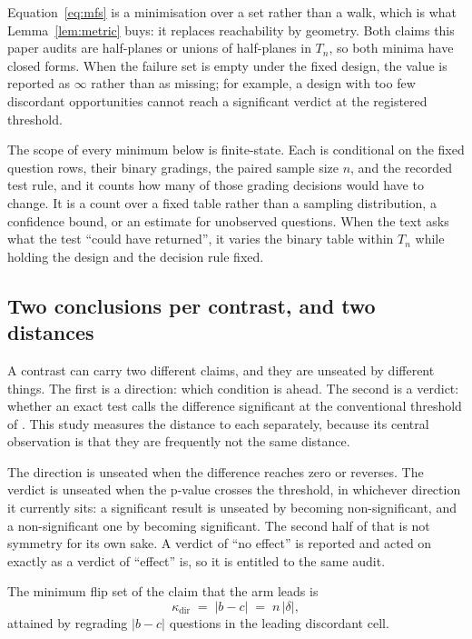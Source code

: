 Equation~\eqref{eq:mfs} is a minimisation over a set rather than a walk, which
is what Lemma~\ref{lem:metric} buys: it replaces reachability by geometry. Both
claims this paper audits are half-planes or unions of half-planes in $T_n$, so
both minima have closed forms.
When the failure set is empty under the fixed design, the value is reported as
$\infty$ rather than as missing; for example, a design with too few discordant
opportunities cannot reach a significant verdict at the registered threshold.

The scope of every minimum below is finite-state. Each is conditional on the
fixed question rows, their binary gradings, the paired sample size $n$, and the
recorded test rule, and it counts how many of those grading decisions would
have to change. It is a count over a fixed table rather than a sampling
distribution, a confidence bound, or an estimate for unobserved questions.
When the text asks what the test ``could have returned'', it varies the binary
table within $T_n$ while holding the design and the decision rule fixed.

\subsection{Two conclusions per contrast, and two distances}

A contrast can carry two different claims, and they are unseated by different
things. The first is a direction: which condition is ahead. The second is a
verdict: whether an exact test calls the difference significant at the
conventional threshold of \AlphaLevel{}. This study measures the distance to
each separately, because its central observation is that they are frequently not
the same distance.

The direction is unseated when the difference reaches zero or reverses. The
verdict is unseated when the p-value crosses the threshold, in whichever
direction it currently sits: a significant result is unseated by becoming
non-significant, and a non-significant one by becoming significant. The second
half of that is not symmetry for its own sake. A verdict of ``no effect'' is
reported and acted on exactly as a verdict of ``effect'' is, so it is entitled
to the same audit.

\begin{proposition}\label{prop:direction}
The minimum flip set of the claim that the arm leads is
\begin{equation}
  \kappa_{\mathrm{dir}} \;=\; |b - c| \;=\; n\,|\delta|,
\end{equation}
attained by regrading $|b - c|$ questions in the leading discordant cell.
\end{proposition}

